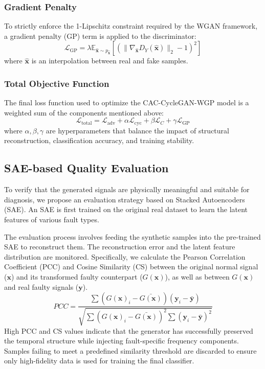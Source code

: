 \subsubsection{Gradient Penalty}
To strictly enforce the 1-Lipschitz constraint required by the WGAN framework, a gradient penalty (GP) term is applied to the discriminator:
\begin{equation}
\mathcal{L}_{\text{GP}} = \lambda \mathbb{E}_{\hat{\boldsymbol{x}} \sim p_{\hat{\boldsymbol{x}}}} [(\|\nabla_{\hat{\boldsymbol{x}}} D_Y(\hat{\boldsymbol{x}})\|_2 - 1)^2]
\end{equation}
where $\hat{\boldsymbol{x}}$ is an interpolation between real and fake samples.

\subsubsection{Total Objective Function}
The final loss function used to optimize the CAC-CycleGAN-WGP model is a weighted sum of the components mentioned above:
\begin{equation}
\mathcal{L}_{\text{total}} = \mathcal{L}_{\text{adv}} + \alpha \mathcal{L}_{\text{cyc}} + \beta \mathcal{L}_{C} + \gamma \mathcal{L}_{\text{GP}}
\end{equation}
where $\alpha, \beta, \gamma$ are hyperparameters that balance the impact of structural reconstruction, classification accuracy, and training stability.

\subsection{SAE-based Quality Evaluation}
To verify that the generated signals are physically meaningful and suitable for diagnosis, we propose an evaluation strategy based on Stacked Autoencoders (SAE). An SAE is first trained on the original real dataset to learn the latent features of various fault types. 

The evaluation process involves feeding the synthetic samples into the pre-trained SAE to reconstruct them. The reconstruction error and the latent feature distribution are monitored. Specifically, we calculate the Pearson Correlation Coefficient (PCC) and Cosine Similarity (CS) between the original normal signal ($\boldsymbol{x}$) and its transformed faulty counterpart ($G(\boldsymbol{x})$), as well as between $G(\boldsymbol{x})$ and real faulty signals ($\boldsymbol{y}$).
\begin{equation}
PCC = \frac{\sum (G(\boldsymbol{x})_i - \bar{G(\boldsymbol{x})})(\boldsymbol{y}_i - \bar{\boldsymbol{y}})}{\sqrt{\sum (G(\boldsymbol{x})_i - \bar{G(\boldsymbol{x})})^2 \sum (\boldsymbol{y}_i - \bar{\boldsymbol{y}})^2}}
\end{equation}
High PCC and CS values indicate that the generator has successfully preserved the temporal structure while injecting fault-specific frequency components. Samples failing to meet a predefined similarity threshold are discarded to ensure only high-fidelity data is used for training the final classifier.


